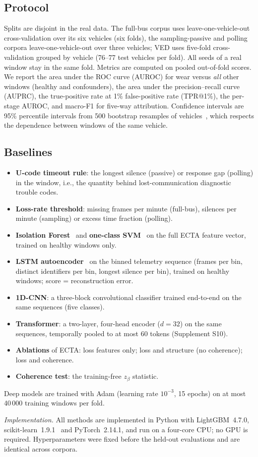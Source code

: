 \subsection{Protocol}
Splits are disjoint in the real data. The full-bus corpus uses
leave-one-vehicle-out cross-validation over its six vehicles (six folds),
the sampling-passive and polling corpora leave-one-vehicle-out over three
vehicles; VED uses five-fold cross-validation grouped by vehicle
(76--77 test vehicles per fold). All seeds of a real window stay in the
same fold. Metrics are computed on pooled out-of-fold scores. We report the
area under the ROC curve (AUROC) for wear versus \emph{all} other windows
(healthy and confounders), the area under the precision--recall curve
(AUPRC), the true-positive rate at 1\% false-positive rate (TPR@1\%), the
per-stage AUROC, and macro-F1 for five-way attribution. Confidence
intervals are 95\% percentile intervals from 500 bootstrap resamples of
vehicles~\cite{efron1993}, which respects the dependence
between windows of the same vehicle.

\subsection{Baselines}
\begin{itemize}
\item \textbf{U-code timeout rule}: the longest silence (passive) or
  response gap (polling) in the window, i.e., the quantity behind
  lost-communication diagnostic trouble codes.
\item \textbf{Loss-rate threshold}: missing frames per minute (full-bus),
  silences per minute (sampling) or excess time fraction (polling).
\item \textbf{Isolation Forest}~\cite{iforest} and \textbf{one-class
  SVM}~\cite{ocsvm} on the full ECTA feature vector, trained on healthy
  windows only.
\item \textbf{LSTM autoencoder}~\cite{malhotra2016} on the binned telemetry
  sequence (frames per bin, distinct identifiers per bin, longest silence
  per bin), trained on healthy windows; score = reconstruction error.
\item \textbf{1D-CNN}: a three-block convolutional classifier trained
  end-to-end on the same sequences (five classes).
\item \textbf{Transformer}: a two-layer, four-head encoder ($d=32$) on the
  same sequences, temporally pooled to at most 60 tokens (Supplement S10).
\item \textbf{Ablations} of ECTA: loss features only; loss and structure
  (no coherence); loss and coherence.
\item \textbf{Coherence test}: the training-free $z_\beta$ statistic.
\end{itemize}
Deep models are trained with Adam (learning rate $10^{-3}$, 15 epochs) on
at most 40\,000 training windows per fold.

\emph{Implementation.} All methods are implemented in Python with
LightGBM~4.7.0, scikit-learn~1.9.1~\cite{sklearn} and PyTorch~2.14.1, and run on a
four-core CPU; no GPU is required. Hyperparameters were fixed before the
held-out evaluations and are identical across corpora.
